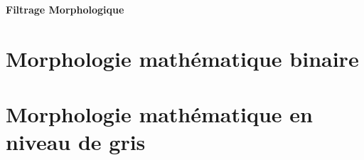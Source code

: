 \documentclass{scrreprt}
\begin{document}
\begin{center}
\large{
\textbf{Filtrage Morphologique}}
\end{center}

\section{Morphologie mathématique binaire}

\newpage
\section{Morphologie mathématique en niveau de gris}
\end{document}
